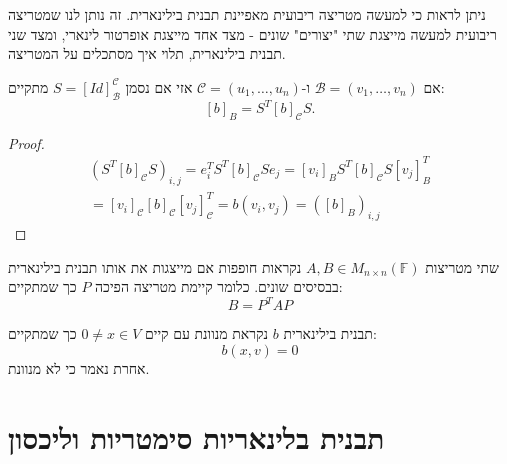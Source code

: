 \documentclass{tstextbook}
\begin{document}
\begin{remark}
ניתן לראות כי למעשה מטריצה ריבועית מאפיינת תבנית בילינארית. זה נותן לנו שמטריצה ריבועית למעשה מייצגת שתי "יצורים" שונים - מצד אחד מייצגת אופרטור לינארי, ומצד שני תבנית בילינארית, תלוי איך מסתכלים על המטריצה.

\end{remark}
\begin{proposition}
אם \(\mathcal{B}=\left( v_{1},\dots,v_{n} \right)\) ו-\(\mathcal{C}=\left( u_{1},\dots,u_{n} \right)\) אזי אם נסמן \(S=[Id]_{\mathcal{B}}^{\mathcal{C}}\) מתקיים:
$$[b]_{B}=S^{T}[b]_{\mathcal{C}}S.$$

\end{proposition}
\begin{proof}
\begin{gather*}{{\left(S^{T}[b]_{\mathcal{C}}S\right)_{i,j}=e_{i}^{T}S^{T}[b]_{\mathcal{C}}S e_{j}}} {{=[v_{i}]_{B}S^{T}[b]_{\mathcal{C}}S[v_{j}]_{B}^{T}}}\\ {{=[v_{i}]_{\mathcal{C}}[b]_{\mathcal{C}}[v_{j}]_{\mathcal{C}}^{T}}} {{=b(v_{i},v_{j})=([b]_{B})_{i,j}}}\end{gather*}

\end{proof}
\begin{definition}
שתי מטריצות \(A, B \in M_{n\times n}\left( \mathbb{F}  \right)\) נקראות חופפות אם מייצגות את אותו תבנית בילינארית בבסיסים שונים. כלומר קיימת מטריצה הפיכה \(P\) כך שמתקיים:
$$B=P^{T}AP$$

\end{definition}
\begin{definition}
תבנית בילינארית \(b\) נקראת מנוונת עם קיים \(0\neq x \in V\) כך שמתקיים:
$$b(x,v)=0$$
אחרת נאמר כי לא מנוונת.

\end{definition}
\section{תבנית בלינאריות סימטריות וליכסון}
\end{document}
